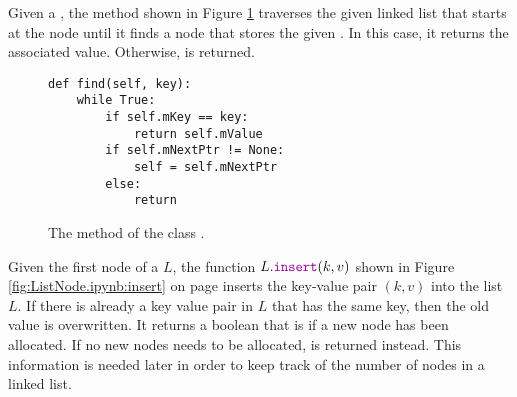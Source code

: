 Given a , the method  shown in Figure \ref{fig:ListNode.ipynb:find} traverses the
given linked list that starts at the node  until it finds a node that stores the 
given .  In this case, it returns the associated value.  Otherwise,  is returned.

\begin{figure}[!ht]
\centering
\begin{verbatim}
def find(self, key):
    while True:
        if self.mKey == key:
            return self.mValue
        if self.mNextPtr != None:
            self = self.mNextPtr
        else:
            return
\end{verbatim}
\vspace*{-0.3cm}
\caption{The method  of the class .}
\label{fig:ListNode.ipynb:find}
\end{figure}

Given the first node of a  $L$, the function $L.\mytt{insert}(k, v)$ shown in Figure
\ref{fig:ListNode.ipynb:insert} on page \pageref{fig:ListNode.ipynb:insert} inserts the key-value pair $(k, v)$
into the list $L$.  If there is already a key value pair in $L$ that has the same key, then the old value is
overwritten.  It returns a boolean that is  if a new node has been allocated.  If no new nodes needs
to be allocated,  is returned instead.  This information is needed
later in order to keep track of the number of nodes in a linked list.

